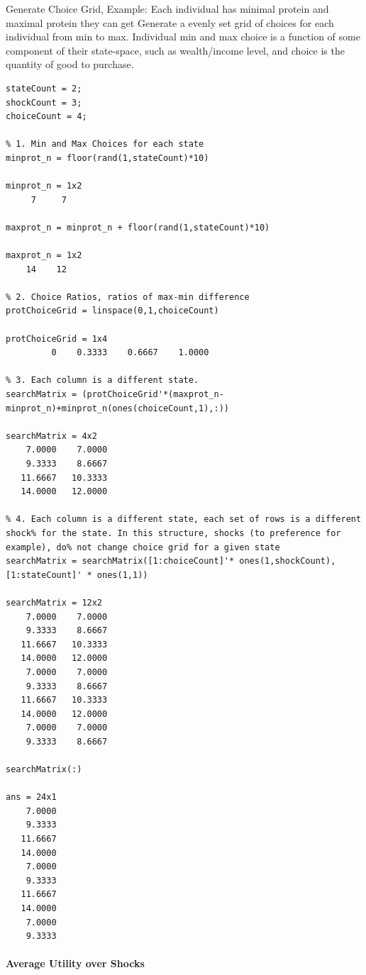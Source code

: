 \documentclass[
]{book}
\begin{document}
Generate Choice Grid, Example: Each individual has minimal protein and
maximal protein they can get Generate a evenly set grid of choices for
each individual from min to max. Individual min and max choice is a
function of some component of their state-space, such as wealth/income
level, and choice is the quantity of good to purchase.

\begin{verbatim}
stateCount = 2;
shockCount = 3;
choiceCount = 4;

% 1. Min and Max Choices for each state
minprot_n = floor(rand(1,stateCount)*10)

minprot_n = 1x2    
     7     7

maxprot_n = minprot_n + floor(rand(1,stateCount)*10)

maxprot_n = 1x2    
    14    12

% 2. Choice Ratios, ratios of max-min difference
protChoiceGrid = linspace(0,1,choiceCount)

protChoiceGrid = 1x4    
         0    0.3333    0.6667    1.0000

% 3. Each column is a different state.
searchMatrix = (protChoiceGrid'*(maxprot_n-minprot_n)+minprot_n(ones(choiceCount,1),:))

searchMatrix = 4x2    
    7.0000    7.0000
    9.3333    8.6667
   11.6667   10.3333
   14.0000   12.0000

% 4. Each column is a different state, each set of rows is a different shock% for the state. In this structure, shocks (to preference for example), do% not change choice grid for a given state
searchMatrix = searchMatrix([1:choiceCount]'* ones(1,shockCount), [1:stateCount]' * ones(1,1))

searchMatrix = 12x2    
    7.0000    7.0000
    9.3333    8.6667
   11.6667   10.3333
   14.0000   12.0000
    7.0000    7.0000
    9.3333    8.6667
   11.6667   10.3333
   14.0000   12.0000
    7.0000    7.0000
    9.3333    8.6667

searchMatrix(:)

ans = 24x1    
    7.0000
    9.3333
   11.6667
   14.0000
    7.0000
    9.3333
   11.6667
   14.0000
    7.0000
    9.3333
\end{verbatim}

\hypertarget{average-utility-over-shocks}{%
\paragraph{\texorpdfstring{\textbf{Average Utility over Shocks}}{Average Utility over Shocks}}\label{average-utility-over-shocks}}
\end{document}
